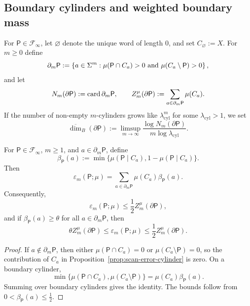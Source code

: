 \subsection{Boundary cylinders and weighted boundary mass}

\begin{definition}
\label{def:boundary-cylinders}
For \(\mathsf{P}\in\mathcal{F}_\infty\), let \(\varnothing\) denote the
unique word of length \(0\), and set \(C_{\varnothing}:=X\).  For
\(m\geq 0\) define
\[
  \partial_m\mathsf{P}
  := \left\{a\in\Sigma^m:
      \mu(\mathsf{P}\cap C_a)>0
      \text{ and }
      \mu(C_a\setminus\mathsf{P})>0\right\},
\]
and let
\[
  N_m(\partial\mathsf{P}) := \operatorname{card}{\partial_m\mathsf{P}},
  \qquad
  Z_m^\mu(\partial\mathsf{P})
  := \sum_{a\in\partial_m\mathsf{P}}\mu(C_a).
\]
If the number of non-empty \(m\)-cylinders grows like
\(\lambda_{\mathrm{cyl}}^m\) for some \(\lambda_{\mathrm{cyl}}>1\), we
set
\[
  \overline{\dim}_B(\partial\mathsf{P})
  := \limsup_{m\to\infty}
      \frac{\log N_m(\partial\mathsf{P})}
           {m\log \lambda_{\mathrm{cyl}}}.
\]
\end{definition}

\begin{proposition}
\label{prop:weighted-boundary-decomposition}
For \(\mathsf{P}\in\mathcal{F}_\infty\), \(m\geq 1\), and
\(a\in\partial_m\mathsf{P}\), define
\[
  \beta_{\mathsf{P}}(a)
  := \min\bigl\{\mu(\mathsf{P}\mid C_a),
                1-\mu(\mathsf{P}\mid C_a)\bigr\}.
\]
Then
\[
  \varepsilon_m(\mathsf{P};\mu)
  = \sum_{a\in\partial_m\mathsf{P}}
      \mu(C_a)\beta_{\mathsf{P}}(a).
\]
Consequently,
\[
  \varepsilon_m(\mathsf{P};\mu)\leq \frac12 Z_m^\mu(\partial\mathsf{P}),
\]
and if \(\beta_{\mathsf{P}}(a)\geq \theta\) for all
\(a\in\partial_m\mathsf{P}\), then
\[
  \theta Z_m^\mu(\partial\mathsf{P})
  \leq \varepsilon_m(\mathsf{P};\mu)
  \leq \frac12 Z_m^\mu(\partial\mathsf{P}).
\]
\end{proposition}

\begin{proof}
If \(a\notin\partial_m\mathsf{P}\), then either
\(\mu(\mathsf{P}\cap C_a)=0\) or \(\mu(C_a\setminus\mathsf{P})=0\), so
the contribution of \(C_a\) in Proposition~\ref{prop:scan-error-cylinder}
is zero.  On a boundary cylinder,
\[
  \min\bigl\{\mu(\mathsf{P}\cap C_a),
             \mu(C_a\setminus\mathsf{P})\bigr\}
  = \mu(C_a)\beta_{\mathsf{P}}(a).
\]
Summing over boundary cylinders gives the identity.  The bounds follow
from \(0<\beta_{\mathsf{P}}(a)\leq \tfrac12\).
\end{proof}

